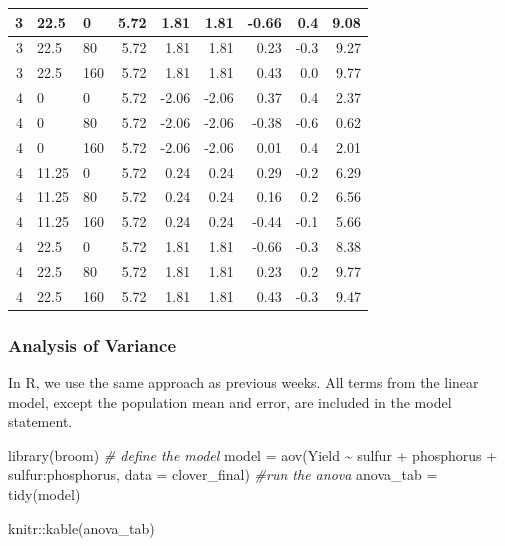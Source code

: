 \documentclass[
]{book}
\newenvironment{Shaded}{\begin{snugshade}}{\end{snugshade}}
\newcommand{\AttributeTok}[1]{\textcolor[rgb]{0.77,0.63,0.00}{#1}}
\newcommand{\CommentTok}[1]{\textcolor[rgb]{0.56,0.35,0.01}{\textit{#1}}}
\newcommand{\FunctionTok}[1]{\textcolor[rgb]{0.00,0.00,0.00}{#1}}
\newcommand{\NormalTok}[1]{#1}
\newcommand{\OtherTok}[1]{\textcolor[rgb]{0.56,0.35,0.01}{#1}}
\newcommand{\SpecialCharTok}[1]{\textcolor[rgb]{0.00,0.00,0.00}{#1}}
\begin{document}
\begin{tabular}{r|l|l|r|r|r|r|r|r}
\hline
3 & 22.5 & 0 & 5.72 & 1.81 & 1.81 & -0.66 & 0.4 & 9.08\\
\hline
3 & 22.5 & 80 & 5.72 & 1.81 & 1.81 & 0.23 & -0.3 & 9.27\\
\hline
3 & 22.5 & 160 & 5.72 & 1.81 & 1.81 & 0.43 & 0.0 & 9.77\\
\hline
4 & 0 & 0 & 5.72 & -2.06 & -2.06 & 0.37 & 0.4 & 2.37\\
\hline
4 & 0 & 80 & 5.72 & -2.06 & -2.06 & -0.38 & -0.6 & 0.62\\
\hline
4 & 0 & 160 & 5.72 & -2.06 & -2.06 & 0.01 & 0.4 & 2.01\\
\hline
4 & 11.25 & 0 & 5.72 & 0.24 & 0.24 & 0.29 & -0.2 & 6.29\\
\hline
4 & 11.25 & 80 & 5.72 & 0.24 & 0.24 & 0.16 & 0.2 & 6.56\\
\hline
4 & 11.25 & 160 & 5.72 & 0.24 & 0.24 & -0.44 & -0.1 & 5.66\\
\hline
4 & 22.5 & 0 & 5.72 & 1.81 & 1.81 & -0.66 & -0.3 & 8.38\\
\hline
4 & 22.5 & 80 & 5.72 & 1.81 & 1.81 & 0.23 & 0.2 & 9.77\\
\hline
4 & 22.5 & 160 & 5.72 & 1.81 & 1.81 & 0.43 & -0.3 & 9.47\\
\hline
\end{tabular}

\hypertarget{analysis-of-variance-2}{%
\subsubsection{Analysis of Variance}\label{analysis-of-variance-2}}

In R, we use the same approach as previous weeks. All terms from the linear model, except the population mean and error, are included in the model statement.

\begin{Shaded}
\begin{Highlighting}[]
\FunctionTok{library}\NormalTok{(broom)}
\CommentTok{\# define the model}
\NormalTok{model }\OtherTok{=} \FunctionTok{aov}\NormalTok{(Yield }\SpecialCharTok{\textasciitilde{}}\NormalTok{ sulfur }\SpecialCharTok{+}\NormalTok{ phosphorus }\SpecialCharTok{+}\NormalTok{ sulfur}\SpecialCharTok{:}\NormalTok{phosphorus, }\AttributeTok{data =}\NormalTok{ clover\_final)}
\CommentTok{\#run the anova}
\NormalTok{anova\_tab }\OtherTok{=} \FunctionTok{tidy}\NormalTok{(model)}

\NormalTok{knitr}\SpecialCharTok{::}\FunctionTok{kable}\NormalTok{(anova\_tab)}
\end{Highlighting}
\end{Shaded}
\end{document}
